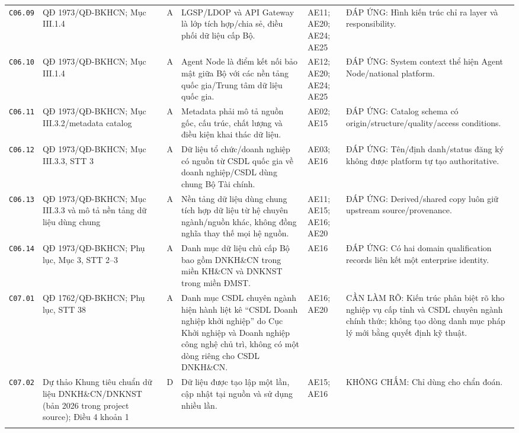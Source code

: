 \begin{longtable}{@{}p{0.9cm}p{3.0cm}p{0.55cm}p{4.05cm}p{2.0cm}p{3.45cm}@{}}
\texttt{C06.09} & QĐ 1973/QĐ-BKHCN; Mục III.1.4 & A & LGSP/LDOP và API Gateway là lớp tích hợp/chia sẻ, điều phối dữ liệu cấp Bộ. & AE11; AE20; AE24; AE25 & ĐÁP ỨNG: Hình kiến trúc chỉ ra layer và responsibility. \\ \addlinespace[1pt]
\texttt{C06.10} & QĐ 1973/QĐ-BKHCN; Mục III.1.4 & A & Agent Node là điểm kết nối bảo mật giữa Bộ với các nền tảng quốc gia/Trung tâm dữ liệu quốc gia. & AE12; AE20; AE24; AE25 & ĐÁP ỨNG: System context thể hiện Agent Node/national platform. \\ \addlinespace[1pt]
\texttt{C06.11} & QĐ 1973/QĐ-BKHCN; Mục III.3.2/metadata catalog & A & Metadata phải mô tả nguồn gốc, cấu trúc, chất lượng và điều kiện khai thác dữ liệu. & AE02; AE15 & ĐÁP ỨNG: Catalog schema có origin/structure/quality/access conditions. \\ \addlinespace[1pt]
\texttt{C06.12} & QĐ 1973/QĐ-BKHCN; Mục III.3.3, STT 3 & A & Dữ liệu tổ chức/doanh nghiệp có nguồn từ CSDL quốc gia về doanh nghiệp/CSDL dùng chung Bộ Tài chính. & AE03; AE16 & ĐÁP ỨNG: Tên/định danh/status đăng ký không được platform tự tạo authoritative. \\ \addlinespace[1pt]
\texttt{C06.13} & QĐ 1973/QĐ-BKHCN; Mục III.3.3 và mô tả nền tảng dữ liệu dùng chung & A & Nền tảng dữ liệu dùng chung tích hợp dữ liệu từ hệ chuyên ngành/nguồn khác, không đồng nghĩa thay thế mọi hệ nguồn. & AE11; AE15; AE16; AE20 & ĐÁP ỨNG: Derived/shared copy luôn giữ upstream source/provenance. \\ \addlinespace[1pt]
\texttt{C06.14} & QĐ 1973/QĐ-BKHCN; Phụ lục, Mục 3, STT 2--3 & A & Danh mục dữ liệu chủ cấp Bộ bao gồm DNKH\&CN trong miền KH\&CN và DNKNST trong miền ĐMST. & AE16 & ĐÁP ỨNG: Có hai domain qualification records liên kết một enterprise identity. \\ \addlinespace[1pt]
\texttt{C07.01} & QĐ 1762/QĐ-BKHCN; Phụ lục, STT 38 & A & Danh mục CSDL chuyên ngành hiện hành liệt kê “CSDL Doanh nghiệp khởi nghiệp” do Cục Khởi nghiệp và Doanh nghiệp công nghệ chủ trì, không có một dòng riêng cho CSDL DNKH\&CN. & AE16; AE20 & CẦN LÀM RÕ: Kiến trúc phân biệt rõ kho nghiệp vụ cấp tỉnh và CSDL chuyên ngành chính thức; không tạo dòng danh mục pháp lý mới bằng quyết định kỹ thuật. \\ \addlinespace[1pt]
\texttt{C07.02} & Dự thảo Khung tiêu chuẩn dữ liệu DNKH\&CN/DNKNST (bản 2026 trong project source); Điều 4 khoản 1 & D & Dữ liệu được tạo lập một lần, cập nhật tại nguồn và sử dụng nhiều lần. & AE15; AE16 & KHÔNG CHẤM: Chỉ dùng cho chẩn đoán. \\ \addlinespace[1pt]

\end{longtable}
